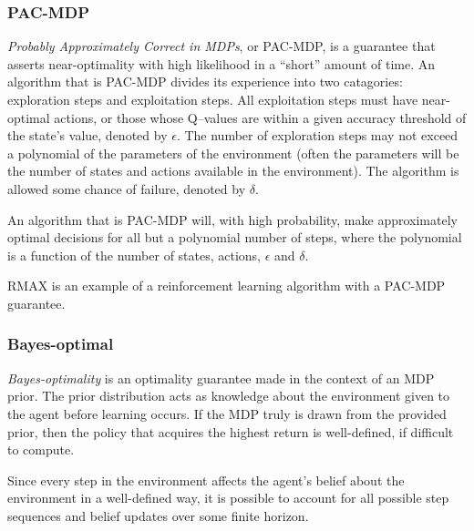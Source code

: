 \subsubsection{PAC-MDP}

\emph{Probably Approximately Correct in MDPs}, or PAC-MDP, is a guarantee that asserts near-optimality with high likelihood in a ``short'' amount of time. An algorithm that is PAC-MDP divides its experience into two catagories: exploration steps and exploitation steps. All exploitation steps must have near-optimal actions, or those whose Q--values are within a given accuracy threshold of the state's value, denoted by $\epsilon$. The number of exploration steps may not exceed a polynomial of the parameters of the environment (often the parameters will be the number of states and actions available in the environment). The algorithm is allowed some chance of failure, denoted by $\delta$.

An algorithm that is PAC-MDP will, with high probability, make approximately optimal decisions for all but a polynomial number of steps, where the polynomial is a function of the number of states, actions, $\epsilon$ and $\delta$.

RMAX\cite{brafman02} is an example of a reinforcement learning algorithm with a PAC-MDP guarantee.

\subsubsection{Bayes-optimal}

\emph{Bayes-optimality} is an optimality guarantee made in the context of an MDP prior. The prior distribution acts as knowledge about the environment given to the agent before learning occurs. If the MDP truly is drawn from the provided prior, then the policy that acquires the highest return is well-defined, if difficult to compute.

Since every step in the environment affects the agent's belief about the environment in a well-defined way, it is possible to account for all possible step sequences and belief updates over some finite horizon.

